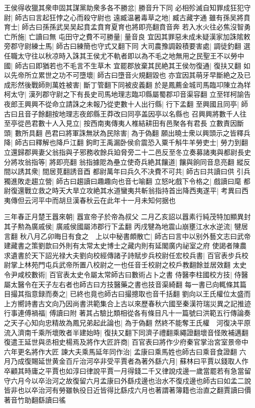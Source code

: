 王侯得收獵其衆申固其謀黨助衆多各不勝忿|{
	勝音升下同}
必相殄滅自知罪成狂犯守尉|{
	師古曰言起狂悖之心而殺守尉也}
遠臧温暑毒草之地|{
	臧古藏字通}
雖有孫吴將賁育士|{
	師古曰孫孫武吴吴起賁孟賁育夏育也將即亮翻賁音奔}
若入水火往必焦沒智勇亡所施|{
	亡讀曰無}
屯田守之費不可勝量|{
	量音良}
宜因其罪惡未成未疑漢家加誅隂敕旁郡守尉練士馬|{
	師古曰練簡也守式又翻下同}
大司農豫調穀積要害處|{
	調徒釣翻}
選任職太守往以秋凉時入誅其王侯尤不軌者即以為不毛之地無用之民聖王不以勞中國|{
	師古曰即猶若也不毛言不生草木}
宜罷郡放棄其民絶其王侯勿復通|{
	復扶又翻}
如以先帝所立累世之功不可墮壞|{
	師古曰墮音火規翻毀也}
亦宜因其萌牙早斷絶之及已成形然後戰師則萬姓被害|{
	斷丁管翻下同被皮義翻}
於是鳳薦金城司馬臨卭陳立為䍧柯太守|{
	漢列郡守尉之下有長史司馬地理志臨卭縣屬蜀郡卭音渠容翻}
立至䍧柯諭告夜郎王興興不從命立請誅之未報乃從吏數十人出行縣|{
	行下孟翻}
至興國且同亭|{
	師古曰且音子餘翻按地理志夜郎縣王莽改曰同亭盖因亭以名縣也}
召興興將數千人往至亭從邑君數十人入見立|{
	按西南夷傳夷人椎結耕田有邑聚各有君長}
立數責因斷頭|{
	數所具翻}
邑君曰將軍誅無狀為民除害|{
	為于偽翻}
願出曉士衆以興頭示之皆釋兵降|{
	師古曰釋解也降戶江翻}
鉤町王禹漏卧侯俞震恐入粟千斛牛羊勞吏士|{
	勞力到翻}
立還歸郡興妻父翁指與子邪務收餘兵廹脅旁二十二邑反至冬立奏募諸夷與都尉長史分將攻翁指等|{
	將即亮翻}
翁指據阸為壘立使奇兵絶其饟道|{
	饟與餉同音息亮翻}
縱反間以誘其衆|{
	間居莧翻誘音酉}
都尉萬年曰兵久不决費不可共|{
	師古曰共讀曰供}
引兵獨進敗走趨立營|{
	師古曰趨讀曰趣趣向也音七喻翻}
立怒叱戲下令格之|{
	戲讀曰麾}
都尉復還戰立救之時天大旱立攻絶其水道蠻夷共斬翁指持首出降西夷遂平|{
	考異曰西夷傳但云河平中而胡旦漢春秋云在此年十一月未知何据也}


三年春正月楚王囂來朝|{
	囂宣帝子於帝為叔父}
二月乙亥詔以囂素行純茂特加顯異封其子勲為廣戚侯|{
	廣戚侯國屬沛郡行下孟翻}
丙戌犍為地震山崩壅江水水逆流|{
	犍居言翻}
秋八月乙卯晦日有食之　上以中秘書頗散亡|{
	師古曰言中以别外藝文志曰武帝建藏書之策劉歆曰外則有太常太史博士之藏内則有延閣廣内祕室之府}
使謁者陳農求遺書於天下詔光禄大夫劉向校經傳諸子詩賦步兵校尉任宏校兵書|{
	百官表步兵校尉掌上林苑門屯兵武帝所置八校尉之一也任音壬校尉之校戶教翻餘並居效翻}
太史令尹咸校數術|{
	百官表太史令屬太常師古曰數術占卜之書}
侍醫李柱國校方技|{
	侍醫屬太醫令在天子左右者也師古曰方技醫藥之書也技音渠綺翻}
每一書已向輒條其篇目撮其指意録而奏之|{
	已終也竟也師古曰撮摠取也音千括翻}
劉向以王氏權位太盛而上方嚮詩書古文向乃因尚書洪範集合上古以來歷春秋六國至秦漢符瑞災異之記推迹行事連傅禍福|{
	傅讀曰附}
著其占驗比類相從各有條目凡十一篇號曰洪範五行傳論奏之天子心知向忠精故為鳳兄弟起此論也|{
	為于偽翻}
然終不能奪王氏權　河復决平原流入濟南千乘所壞敗者半建始時|{
	復扶又翻下同濟子禮翻乘繩證翻壞音怪敗補邁翻}
復遣王延世與丞相史楊焉及將作大匠許商|{
	百官表曰將作少府秦官掌治宮室景帝中六年更名將作大匠}
諫大夫乘馬延年同作治|{
	孟康曰乘馬姓也師古曰乘音食證翻}
六月乃成復賜延世黄金百斤治河卒非受平賈者為著外繇六月|{
	蘇林曰平賈以錢取人作卒顧其時庸之平賈也如淳曰律說平賈一月得錢二千又律說戍邊一歲當罷若有急當留守六月今以卒治河之故復留六月孟康曰外繇戍邊也治水不復戍邊也師古曰如孟二說皆非也以卒治河有勞雖執役日近皆得比繇戍六月也著謂著簿籍也治直之翻賈讀曰價著音竹助翻繇讀曰徭}


